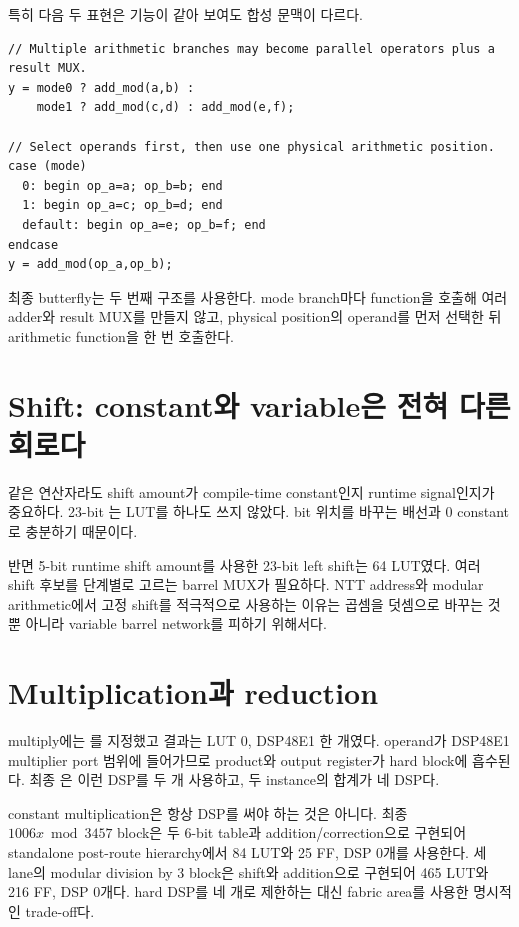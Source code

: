 특히 다음 두 표현은 기능이 같아 보여도 합성 문맥이 다르다.

\begin{lstlisting}
// Multiple arithmetic branches may become parallel operators plus a result MUX.
y = mode0 ? add_mod(a,b) :
    mode1 ? add_mod(c,d) : add_mod(e,f);

// Select operands first, then use one physical arithmetic position.
case (mode)
  0: begin op_a=a; op_b=b; end
  1: begin op_a=c; op_b=d; end
  default: begin op_a=e; op_b=f; end
endcase
y = add_mod(op_a,op_b);
\end{lstlisting}

최종 butterfly는 두 번째 구조를 사용한다. mode branch마다 function을 호출해
여러 adder와 result MUX를 만들지 않고, physical position의 operand를 먼저
선택한 뒤 arithmetic function을 한 번 호출한다.

\section{Shift: constant와 variable은 전혀 다른 회로다}

같은 \rtlfile{<<} 연산자라도 shift amount가 compile-time constant인지
runtime signal인지가 중요하다. 23-bit 는 LUT를 하나도 쓰지
않았다. bit 위치를 바꾸는 배선과 0 constant로 충분하기 때문이다.

반면 5-bit runtime shift amount를 사용한 23-bit left shift는 64 LUT였다.
여러 shift 후보를 단계별로 고르는 barrel MUX가 필요하다. NTT address와
modular arithmetic에서 고정 shift를 적극적으로 사용하는 이유는 곱셈을
덧셈으로 바꾸는 것뿐 아니라 variable barrel network를 피하기 위해서다.

\section{Multiplication과 reduction}

 multiply에는 를 지정했고 결과는 LUT 0,
DSP48E1 한 개였다. operand가 DSP48E1 multiplier port 범위에 들어가므로
product와 output register가 hard block에 흡수된다. 최종
은 이런 DSP를 두 개 사용하고, 두 instance의 합계가
네 DSP다.

constant multiplication은 항상 DSP를 써야 하는 것은 아니다. 최종
$1006x\bmod3457$ block은 두 6-bit table과 addition/correction으로 구현되어
standalone post-route hierarchy에서 84 LUT와 25 FF, DSP 0개를 사용한다.
세 lane의 modular division by 3 block은 shift와 addition으로 구현되어
465 LUT와 216 FF, DSP 0개다. hard DSP를 네 개로 제한하는 대신 fabric
area를 사용한 명시적인 trade-off다.

